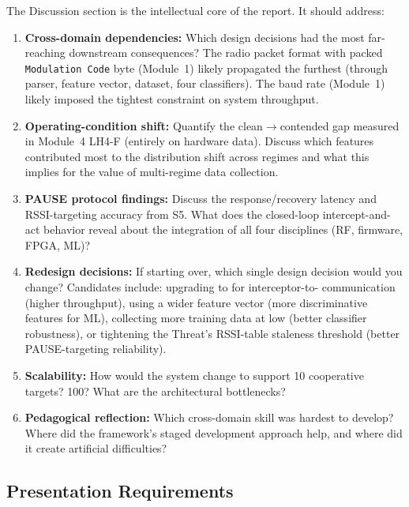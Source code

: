 \documentclass[11pt,letterpaper]{article}
\begin{document}
	\begin{tcolorbox}[infobox={Writing the Discussion Section}]
		The Discussion section is the intellectual core of the report. It should address:
		\begin{enumerate}
			\item \textbf{Cross-domain dependencies:} Which design decisions had the most far-reaching downstream consequences? The radio packet format with packed \texttt{Modulation Code} byte (Module~1) likely propagated the furthest (through parser, feature vector, dataset, four classifiers). The \UART{} baud rate (Module~1) likely imposed the tightest constraint on system throughput.
			\item \textbf{Operating-condition shift:} Quantify the clean$\to$contended gap measured in Module~4 LH4-F (entirely on hardware data). Discuss which features contributed most to the distribution shift across regimes and what this implies for the value of multi-regime data collection.
			\item \textbf{PAUSE protocol findings:} Discuss the response/recovery latency and RSSI-targeting accuracy from S5. What does the closed-loop intercept-and-act behavior reveal about the integration of all four disciplines (RF, firmware, FPGA, ML)?
			\item \textbf{Redesign decisions:} If starting over, which single design decision would you change? Candidates include: upgrading to \SPI{} for interceptor-to-\FPGA{} communication (higher throughput), using a wider feature vector (more discriminative features for ML), collecting more training data at low \SNR{} (better classifier robustness), or tightening the Threat's RSSI-table staleness threshold (better PAUSE-targeting reliability).
			\item \textbf{Scalability:} How would the system change to support 10 cooperative targets? 100? What are the architectural bottlenecks?
			\item \textbf{Pedagogical reflection:} Which cross-domain skill was hardest to develop? Where did the framework's staged development approach help, and where did it create artificial difficulties?
		\end{enumerate}
	\end{tcolorbox}

	\subsection{Presentation Requirements}
\end{document}
